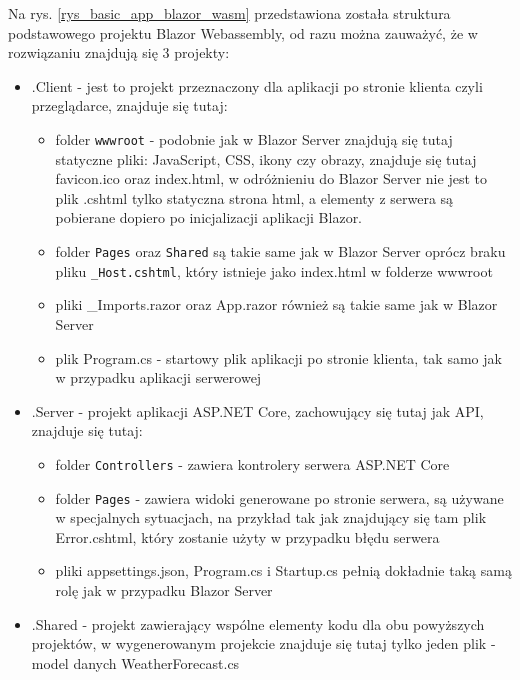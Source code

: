 \documentclass[12pt,a4paper,oneside]{book}
\begin{document}
Na rys. \ref{rys_basic_app_blazor_wasm} przedstawiona została struktura podstawowego projektu Blazor Webassembly, od razu można zauważyć, że w rozwiązaniu znajdują się 3 projekty:

\begin{itemize}
  \item .Client - jest to projekt przeznaczony dla aplikacji po stronie klienta czyli przeglądarce, znajduje się tutaj:
	\begin{itemize}
	  \item folder \texttt{wwwroot} - podobnie jak w Blazor Server znajdują się tutaj statyczne pliki: JavaScript, CSS, ikony czy obrazy, znajduje się tutaj favicon.ico oraz index.html, w odróżnieniu do Blazor Server nie jest to plik .cshtml tylko statyczna strona html, a elementy z serwera są pobierane dopiero po inicjalizacji aplikacji Blazor.
	  \item folder \texttt{Pages} oraz \texttt{Shared} są takie same jak w Blazor Server oprócz braku pliku \texttt{\_Host.cshtml}, który istnieje jako index.html w folderze wwwroot
	  \item pliki \_Imports.razor oraz App.razor również są takie same jak w Blazor Server
	  \item plik Program.cs - startowy plik aplikacji po stronie klienta, tak samo jak w przypadku aplikacji serwerowej
	\end{itemize}
  \item .Server - projekt aplikacji ASP.NET Core, zachowujący się tutaj jak API, znajduje się tutaj:
	\begin{itemize}
	  \item folder \texttt{Controllers} - zawiera kontrolery serwera ASP.NET Core
	  \item folder \texttt{Pages} - zawiera widoki generowane po stronie serwera, są używane w specjalnych sytuacjach, na przykład tak jak znajdujący się tam plik Error.cshtml, który zostanie użyty w przypadku błędu serwera
	  \item pliki appsettings.json, Program.cs i Startup.cs pełnią dokładnie taką samą rolę jak w przypadku Blazor Server
	\end{itemize}
  \item .Shared - projekt zawierający wspólne elementy kodu dla obu powyższych projektów, w wygenerowanym projekcie znajduje się tutaj tylko jeden plik - model danych WeatherForecast.cs
\end{itemize}
\end{document}
